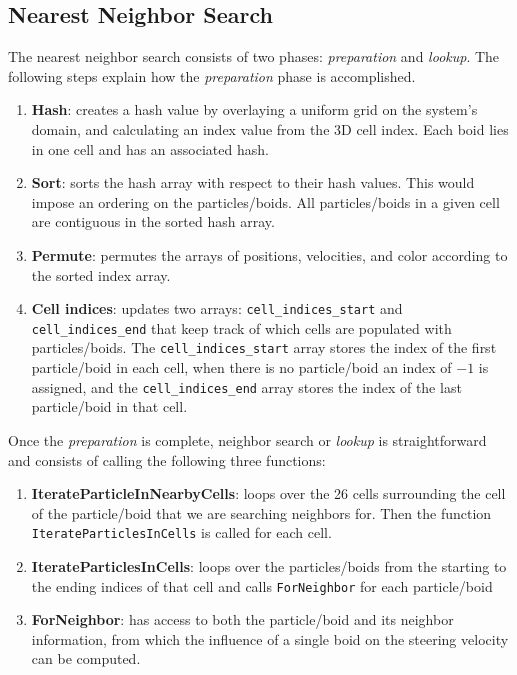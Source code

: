 \subsection{Nearest Neighbor Search}
The nearest neighbor search consists of two phases: \textit{preparation} and \textit{lookup}. The following steps explain how the \textit{preparation} phase is accomplished.

\begin{enumerate}
\item{\textbf{Hash}: creates a hash value by overlaying a uniform grid on the system's domain, and calculating an index value from the 3D cell index. Each boid lies in one cell and has an associated hash.}
\item{\textbf{Sort}: sorts the hash array with respect to their hash values. This would impose an ordering on the particles/boids. All particles/boids in a given cell are contiguous in the sorted hash array.}
\item{\textbf{Permute}:  permutes the arrays of positions, velocities, and color according to the sorted index array.}
\item{\textbf{Cell indices}: updates two arrays: \texttt{cell\_indices\_start} and \texttt{cell\_indices\_end} that keep track of which cells are populated with particles/boids. The \texttt{cell\_indices\_start} array stores the index of the first particle/boid in each cell, when there is no particle/boid an index of $-1$ is assigned, and the \texttt{cell\_indices\_end} array stores the index of the last particle/boid in that cell.}
\end{enumerate}

Once the \textit{preparation} is complete, neighbor search or \textit{lookup} is straightforward and consists of calling the following three functions:  

\begin{enumerate}
\item{\textbf{IterateParticleInNearbyCells}: loops over the 26 cells surrounding the cell of the particle/boid that we are searching neighbors for. Then the function \texttt{IterateParticlesInCells} is called for each cell.}
\item{\textbf{IterateParticlesInCells}: loops over the particles/boids from the starting to the ending indices of that cell and calls \texttt{ForNeighbor} for each particle/boid}
\item{\textbf{ForNeighbor}: has access to both the particle/boid and its neighbor information, from which the influence of a single boid on the steering velocity can be computed.}
\end{enumerate}

